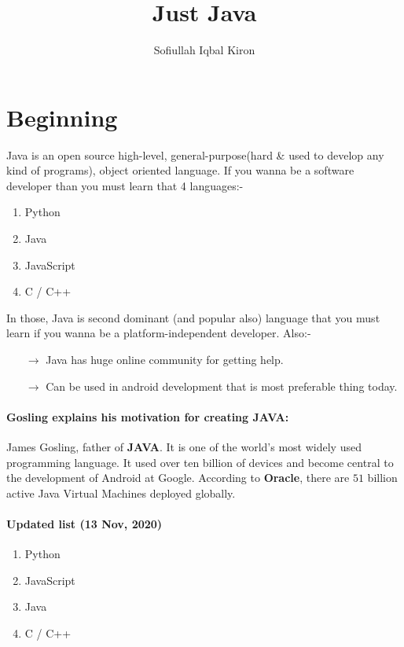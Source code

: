 \documentclass[10 pt]{article}
\title{Just Java}
\author{Sofiullah Iqbal Kiron}
\begin{document}
\maketitle
\justify

\section{Beginning}
Java is an open source high-level, general-purpose(hard \& used to develop any kind of programs), object oriented language. If you wanna be a software developer than you must learn that 4 languages:-

\begin{enumerate}
	\item Python
	\item Java
	\item JavaScript
	\item C / C++
\end{enumerate}

In those, Java is second dominant (and popular also) language that you must learn if you wanna be a platform-independent developer. Also:-
\begin{itemize}
	\item[$\rightarrow$] Java has huge online community for getting help.
	\item[$\rightarrow$] Can be used in android development that is most preferable thing today.
\end{itemize}

\paragraph{Gosling explains his motivation for creating \textbf{JAVA}:}
James Gosling, father of \textbf{JAVA}. It is one of the world's most widely used programming language. It used over ten billion of devices and become central to the development of Android at Google. According to \textbf{Oracle}, there are $51$ billion active Java Virtual Machines deployed globally.

\paragraph{Updated list (13 Nov, 2020)}
\begin{enumerate}
	\item Python
	\item JavaScript
	\item Java
	\item C / C++
\end{enumerate}
\end{document}
